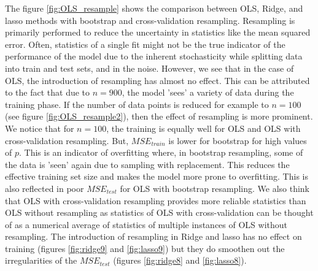 The figure \ref{fig:OLS_resample} shows the comparison between OLS, Ridge, and lasso methods with bootstrap and cross-validation resampling. Resampling is primarily performed to reduce the uncertainty in statistics like the mean squared error. Often, statistics of a single fit might not be the true indicator of the performance of the model due to the inherent stochasticity while splitting data into train and test sets, and in the noise. However, we see that in the case of OLS, the introduction of resampling has almost no effect. This can be attributed to the fact that due to $n = 900$, the model 'sees' a variety of data during the training phase. If the number of data points is reduced for example to $n=100$ (see figure \ref{fig:OLS_resample2}), then the effect of resampling is more prominent. We notice that for $n=100$, the training is equally well for OLS and OLS with cross-validation resampling. But, $MSE_{train}$ is lower for bootstrap for high values of $p$. This is an indicator of overfitting where, in bootstrap resampling, some of the data is 'seen' again due to sampling with replacement. This reduces the effective training set size and makes the model more prone to overfitting. This is also reflected in poor $MSE_{test}$ for OLS with bootstrap resampling. We also think that OLS with cross-validation resampling provides more reliable statistics than OLS without resampling as statistics of OLS with cross-validation can be thought of as a numerical average of statistics of multiple instances of OLS without resampling. The introduction of resampling in Ridge and lasso has no effect on training (figures \ref{fig:ridge9} and \ref{fig:lasso9}) but they do smoothen out the irregularities of the $MSE_{test}$ (figures \ref{fig:ridge8} and \ref{fig:lasso8}).


